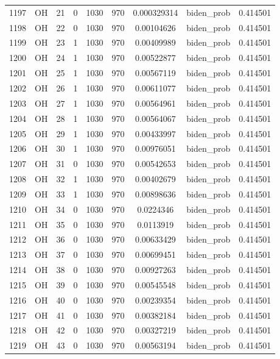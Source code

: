 \documentclass[12pt,a4paper]{article}
\begin{document}
\begin{tabular}{r|cccccccc}
	1197 & OH & 21 & 0 & 1030 & 970 & 0.000329314 & biden\_prob & 0.414501 \\
	1198 & OH & 22 & 0 & 1030 & 970 & 0.00104626 & biden\_prob & 0.414501 \\
	1199 & OH & 23 & 1 & 1030 & 970 & 0.00409989 & biden\_prob & 0.414501 \\
	1200 & OH & 24 & 1 & 1030 & 970 & 0.00522877 & biden\_prob & 0.414501 \\
	1201 & OH & 25 & 1 & 1030 & 970 & 0.00567119 & biden\_prob & 0.414501 \\
	1202 & OH & 26 & 1 & 1030 & 970 & 0.00611077 & biden\_prob & 0.414501 \\
	1203 & OH & 27 & 1 & 1030 & 970 & 0.00564961 & biden\_prob & 0.414501 \\
	1204 & OH & 28 & 1 & 1030 & 970 & 0.00564067 & biden\_prob & 0.414501 \\
	1205 & OH & 29 & 1 & 1030 & 970 & 0.00433997 & biden\_prob & 0.414501 \\
	1206 & OH & 30 & 1 & 1030 & 970 & 0.00976051 & biden\_prob & 0.414501 \\
	1207 & OH & 31 & 0 & 1030 & 970 & 0.00542653 & biden\_prob & 0.414501 \\
	1208 & OH & 32 & 1 & 1030 & 970 & 0.00402679 & biden\_prob & 0.414501 \\
	1209 & OH & 33 & 1 & 1030 & 970 & 0.00898636 & biden\_prob & 0.414501 \\
	1210 & OH & 34 & 0 & 1030 & 970 & 0.0224346 & biden\_prob & 0.414501 \\
	1211 & OH & 35 & 0 & 1030 & 970 & 0.0113919 & biden\_prob & 0.414501 \\
	1212 & OH & 36 & 0 & 1030 & 970 & 0.00633429 & biden\_prob & 0.414501 \\
	1213 & OH & 37 & 0 & 1030 & 970 & 0.00699451 & biden\_prob & 0.414501 \\
	1214 & OH & 38 & 0 & 1030 & 970 & 0.00927263 & biden\_prob & 0.414501 \\
	1215 & OH & 39 & 0 & 1030 & 970 & 0.00545548 & biden\_prob & 0.414501 \\
	1216 & OH & 40 & 0 & 1030 & 970 & 0.00239354 & biden\_prob & 0.414501 \\
	1217 & OH & 41 & 0 & 1030 & 970 & 0.00382184 & biden\_prob & 0.414501 \\
	1218 & OH & 42 & 0 & 1030 & 970 & 0.00327219 & biden\_prob & 0.414501 \\
	1219 & OH & 43 & 0 & 1030 & 970 & 0.00563194 & biden\_prob & 0.414501 \\

\end{tabular}
\end{document}
